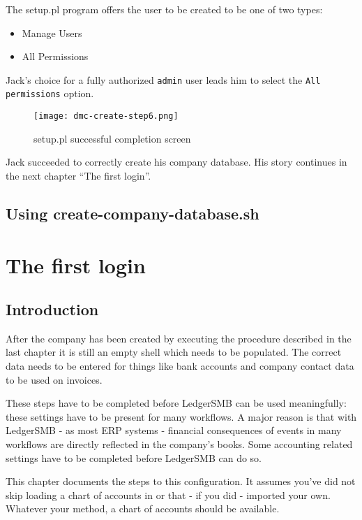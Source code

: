 The setup.pl program offers the user to be created to be one of two types:

\begin{itemize}
\item Manage Users
\item All Permissions
\end{itemize}

Jack's choice for a fully authorized \texttt{admin} user leads him to select the
\texttt{All permissions} option.

\begin{figure}[h]
\centering
\texttt{[image: dmc-create-step6.png]}
\caption{setup.pl successful completion screen}
\label{fig:setup-step6}
\end{figure}

Jack succeeded to correctly create his company database. His story continues in
the next chapter ``The first login''.

\section{Using create-company-database.sh}



\chapter{The first login}
\label{cha:the-first-login}

\section{Introduction}

After the company has been created by executing the procedure described in the last
chapter it is still an empty shell which needs to be populated. The correct data
needs to be entered for things like bank accounts and company contact data to be used
on invoices.

These steps have to be completed before LedgerSMB can be used meaningfully: these
settings have to be present for many workflows. A major reason is that with LedgerSMB
- as most ERP systems - financial
consequences of events in many workflows are directly reflected in the company's books.
Some accounting related settings have to be completed before LedgerSMB can do so.

This chapter documents the steps to this configuration. It assumes you've did not skip
loading a chart of accounts in  or that - if you did -
imported your own. Whatever your method, a chart of accounts should be available.

